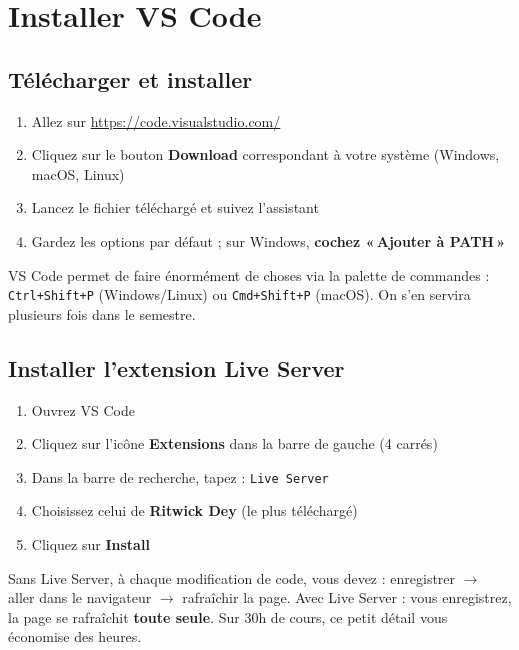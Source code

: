 \documentclass[11pt,a4paper]{article}
\begin{document}
\section{Installer VS Code}

\subsection{Télécharger et installer}

\begin{enumerate}[nosep]
    \item Allez sur \url{https://code.visualstudio.com/}
    \item Cliquez sur le bouton \textbf{Download} correspondant à votre système (Windows, macOS, Linux)
    \item Lancez le fichier téléchargé et suivez l'assistant
    \item Gardez les options par défaut ; sur Windows, \textbf{cochez «\,Ajouter à PATH\,»}
\end{enumerate}

\begin{infobox}
VS Code permet de faire énormément de choses via la palette de commandes :
\texttt{Ctrl+Shift+P} (Windows/Linux) ou \texttt{Cmd+Shift+P} (macOS). On
s'en servira plusieurs fois dans le semestre.
\end{infobox}

\subsection{Installer l'extension Live Server}

\begin{enumerate}[nosep]
    \item Ouvrez VS Code
    \item Cliquez sur l'icône \textbf{Extensions} dans la barre de gauche (4 carrés)
    \item Dans la barre de recherche, tapez : \texttt{Live Server}
    \item Choisissez celui de \textbf{Ritwick Dey} (le plus téléchargé)
    \item Cliquez sur \textbf{Install}
\end{enumerate}

\begin{retenirbox}
Sans Live Server, à chaque modification de code, vous devez :
enregistrer $\to$ aller dans le navigateur $\to$ rafraîchir la page.
Avec Live Server : vous enregistrez, la page se rafraîchit \textbf{toute
seule}. Sur 30h de cours, ce petit détail vous économise des heures.
\end{retenirbox}
\end{document}

